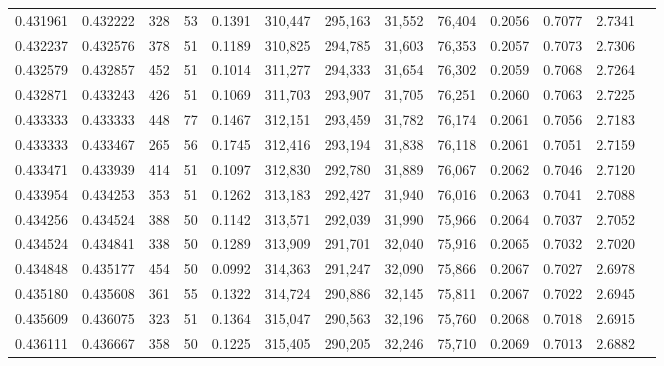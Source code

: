 \begin{tabular}{rrrrrrrrrrrrr}
0.431961 & 0.432222 &    328 &    53 &                                     0.1391 & 310,447 & 295,163 &  31,552 &  76,404 & 0.2056 & 0.7077 & 2.7341 \\
0.432237 & 0.432576 &    378 &    51 &                                     0.1189 & 310,825 & 294,785 &  31,603 &  76,353 & 0.2057 & 0.7073 & 2.7306 \\
0.432579 & 0.432857 &    452 &    51 &                                     0.1014 & 311,277 & 294,333 &  31,654 &  76,302 & 0.2059 & 0.7068 & 2.7264 \\
0.432871 & 0.433243 &    426 &    51 &                                     0.1069 & 311,703 & 293,907 &  31,705 &  76,251 & 0.2060 & 0.7063 & 2.7225 \\
0.433333 & 0.433333 &    448 &    77 &                                     0.1467 & 312,151 & 293,459 &  31,782 &  76,174 & 0.2061 & 0.7056 & 2.7183 \\
0.433333 & 0.433467 &    265 &    56 &                                     0.1745 & 312,416 & 293,194 &  31,838 &  76,118 & 0.2061 & 0.7051 & 2.7159 \\
0.433471 & 0.433939 &    414 &    51 &                                     0.1097 & 312,830 & 292,780 &  31,889 &  76,067 & 0.2062 & 0.7046 & 2.7120 \\
0.433954 & 0.434253 &    353 &    51 &                                     0.1262 & 313,183 & 292,427 &  31,940 &  76,016 & 0.2063 & 0.7041 & 2.7088 \\
0.434256 & 0.434524 &    388 &    50 &                                     0.1142 & 313,571 & 292,039 &  31,990 &  75,966 & 0.2064 & 0.7037 & 2.7052 \\
0.434524 & 0.434841 &    338 &    50 &                                     0.1289 & 313,909 & 291,701 &  32,040 &  75,916 & 0.2065 & 0.7032 & 2.7020 \\
0.434848 & 0.435177 &    454 &    50 &                                     0.0992 & 314,363 & 291,247 &  32,090 &  75,866 & 0.2067 & 0.7027 & 2.6978 \\
0.435180 & 0.435608 &    361 &    55 &                                     0.1322 & 314,724 & 290,886 &  32,145 &  75,811 & 0.2067 & 0.7022 & 2.6945 \\
0.435609 & 0.436075 &    323 &    51 &                                     0.1364 & 315,047 & 290,563 &  32,196 &  75,760 & 0.2068 & 0.7018 & 2.6915 \\
0.436111 & 0.436667 &    358 &    50 &                                     0.1225 & 315,405 & 290,205 &  32,246 &  75,710 & 0.2069 & 0.7013 & 2.6882 \\

\end{tabular}
